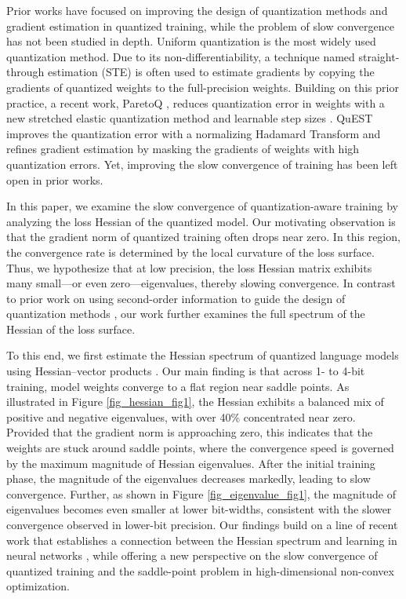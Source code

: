 \documentclass{article}
\theoremstyle{definition}
\begin{document}
Prior works have focused on improving the design of quantization methods and gradient estimation in quantized training, while the problem of slow convergence has not been studied in depth. Uniform quantization is the most widely used quantization method. Due to its non-differentiability, a technique named straight-through estimation (STE) \citep{bengio2013estimating} is often used to estimate gradients by copying the gradients of quantized weights to the full-precision weights. Building on this prior practice, a recent work, ParetoQ \citep{liu2025paretoq}, reduces quantization error in weights with a new stretched elastic quantization method and learnable step sizes \citep{esser2020learned}. QuEST \citep{panferov2025quest} improves the quantization error with a normalizing Hadamard Transform and refines gradient estimation by masking the gradients of weights with high quantization errors. Yet, improving the slow convergence of training has been left open in prior works. 

In this paper, we examine the slow convergence of quantization-aware training by analyzing the loss Hessian of the quantized model. Our motivating observation is that the gradient norm of quantized training often drops near zero.
In this region, the convergence rate is determined by the local curvature of the loss surface.
Thus, we hypothesize that at low precision, the loss Hessian matrix exhibits many small---or even zero---eigenvalues, thereby slowing convergence.
In contrast to prior work on using second-order information to guide the design of quantization methods \cite{dong2019hawq,dong2020hawq}, our work further examines the full spectrum of the Hessian of the loss surface.

To this end, we first estimate the Hessian spectrum of quantized language models using Hessian–vector products \citep{bai1996some,ghorbani2019investigation}.
Our main finding is that across 1- to 4-bit training, model weights converge to a flat region near saddle points. As illustrated in Figure \ref{fig_hessian_fig1}, the Hessian exhibits a balanced mix of positive and negative eigenvalues, with over 40\% concentrated near zero. Provided that the gradient norm is approaching zero, this indicates that the weights are stuck around saddle points, where the convergence speed is governed by the maximum magnitude of Hessian eigenvalues. After the initial training phase, the magnitude of the eigenvalues decreases markedly, leading to slow convergence. Further, as shown in Figure \ref{fig_eigenvalue_fig1}, the magnitude of eigenvalues becomes even smaller at lower bit-widths, consistent with the slower convergence observed in lower-bit precision. Our findings build on a line of recent work that establishes a connection between the Hessian spectrum and learning in neural networks \cite{ju2022robust,ju2023generalization,zhang2023noise,zhang2026scalable}, while offering a new perspective on the slow convergence of quantized training and the saddle-point problem in high-dimensional non-convex optimization. 
\end{document}
